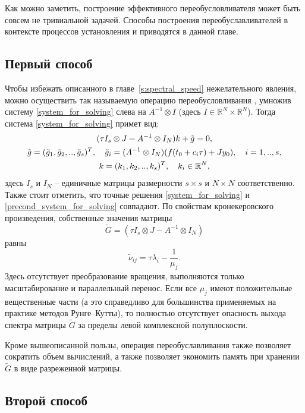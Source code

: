 \documentclass[a4paper,14pt]{extreport}
\begin{document}
	Как можно заметить, построение эффективного переобусловливателя может быть совсем не тривиальной задачей. Способы построения переобуславливателей в контексте процессов установления и приводятся в данной главе.
    
  \subsection{Первый способ}
  \label{ss:precond_1}
  Чтобы  избежать описанного в главе~\ref{s:spectral_speed} нежелательного явления, можно осуществить так называемую операцию переобусловливания \cite{gomel},\cite{konf_may}  умножив систему \eqref{system_for_solving} слева на $A^{-1}\otimes I$ (здесь $I\in \mathbb{R}^N \times \mathbb{R}^N $). Тогда система \eqref{system_for_solving} примет вид:
\begin{gather}\label{precond_system_for_solving}
(\tau I_s\otimes J-A^{-1}\otimes I_N)k+\tilde g=0,\\
\notag \tilde g=(\tilde g_1,\tilde g_2,..,\tilde g_s)^T, \quad \tilde g_i=(A^{-1}\otimes I_N)(f(t_0+c_i \tau)+Jy_0), \quad i=1,..,s,\\
\notag k=(k_1,k_2,..,k_s)^T, \quad k_i \in \mathbb{R}^N,
\end{gather}
здесь $I_s$ и $I_N$ -- единичные матрицы размерности $s\times s$ и
$N \times N$ соответственно. Также стоит отметить, что точные
решения \eqref{system_for_solving} и
\eqref{precond_system_for_solving} совпадают. По свойствам
кронекеровского произведения, собственные значения
матрицы
$$\tilde G =(\tau I_s\otimes J-A^{-1}\otimes I_N) $$
равны
$$\tilde \nu_{ij} = \tau \lambda_i - \frac{1}{ \mu_j}.$$
Здесь отсутствует преобразование вращения, выполняются только
масштабирование и параллельный перенос.  Если все $\mu_j$ имеют
положительные вещественные части (а это справедливо для большинства
применяемых на практике методов Рунге--Кутты), то полностью
отсутствует опасность выхода спектра матрицы $\tilde G$ за пределы
левой комплексной полуплоскости. 

Кроме вышеописанной пользы, операция переобуславливания также позволяет сократить объем вычислений, а также позволяет экономить память при хранении $\tilde G$ в виде разреженной матрицы\cite{Bondar}.
  
  
  \subsection{Второй способ}
  \label{ss:precond_2}
  
\end{document}
